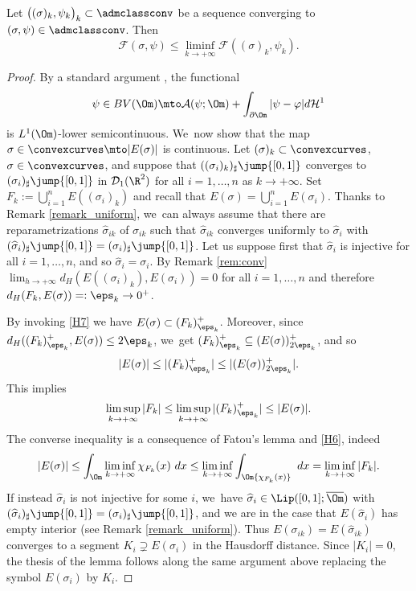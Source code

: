 \begin{lemma}
\label{lem:lower_semicontinuity_of_F}
Let $\big((\sigma)_k,\psi_k\big)_k\subset\admclassconv$ be a sequence converging
to $(\sigma,\psi)\in \admclassconv$. Then
\begin{equation*}
\mathcal{F}(\sigma,\psi)\le\liminf_{k\to+\infty}\mathcal{F}((\sigma)_k,\psi_k).
\end{equation*}
\end{lemma}
\begin{proof}
By a standard argument \cite{Giusti:84}, the functional
\begin{equation*}
\psi\in BV(\Om)\mto \mathcal{A}(\psi;\Om)+\int_{\partial\Om}|\psi-\varphi|d\mathcal H^1
\end{equation*}
is $L^1(\Om)$-lower semicontinuous. We~now show that the map $\sigma \in
\convexcurves
\mto|E(\sigma)|$
is continuous.
Let $(\sigma)_k \subset \convexcurves$,
$\sigma \in\convexcurves$, and suppose that
$((\sigma_{i})_k)_\sharp\jump{[0,1]}$ converges to $(\sigma_i)_\sharp\jump{[0,1]}$ in $\mathcal D_1(\R^2)$
for all $i=1,\dots,n$ as $k \to +\infty$.
Set $F_k:=\bigcup_{i=1}^n E((\sigma_{i})_k)$ and recall that
$E(\sigma)=\bigcup_{i=1}^n E(\sigma_{i})$. { Thanks to Remark \ref{remark_uniform}, we~can always assume that there are reparametrizations $\widehat\sigma_{ik}$ of $\sigma_{ik}$ such that $\widehat\sigma_{ik}$ converges uniformly to $\widehat \sigma_i$ with $(\widehat \sigma_i)_\sharp\jump{[0,1]}=(\sigma_i)_\sharp\jump{[0,1]}$. Let us suppose first that $\widehat \sigma_i$ is injective for all $i=1,\dots,n$, and so $\widehat\sigma_i=\sigma_i$.}
By Remark \ref{rem:conv}
$\lim_{h \to +\infty} d_H(E((\sigma_{i})_k),E(\sigma_i)) = 0$
for all $i=1,\dots,n$ and therefore $d_H(F_k,E(\sigma)) =: \eps_k\to 0^+$.

By invoking \ref{H7} we have $E(\sigma)\subset (F_k)^+_{\eps_k}$.
Moreover, since $d_H((F_k)_{\eps_k}^+,E(\sigma))\leq 2\eps_k$, we~get $(F_k)^+_{\eps_k}\subseteq (E(\sigma))_{2\eps_k}^+$, and so
\begin{equation*}
\vert E(\sigma)\vert\le \vert (F_k)^+_{\eps_k}\vert
\le \vert (E(\sigma))_{2\eps_k}^+\vert.
\end{equation*}
This implies
\[
\limsup_{k\to+\infty} |F_k|\leq \limsup_{k\to+\infty} |(F_k)^+_{\eps_k}|\le\mathcal |E(\sigma)|.
\]
The converse inequality is a consequence of Fatou's lemma and \ref{H6}, indeed
\[
|E(\sigma)|\leq \int_\Om\liminf_{k\to+\infty}{\chi_{F_k}(x)}~dx\leq\liminf_{k\to+\infty}\int_\Om{\chi_{F_k}(x)}~dx =\liminf_{k\to+\infty}|F_k|.
\]
If instead $\widehat\sigma_i$ is not injective for some $i$, we~have $\widehat \sigma_i\in\Lip([0,1];\overline\Om)$ with $(\widehat \sigma_i)_\sharp\jump{[0,1]}=(\sigma_i)_\sharp\jump{[0,1]}$, and we are in the case that $E(\widehat\sigma_i)$ has empty interior (see Remark \ref{remark_uniform}). Thus $ E(\sigma_{ik})=E(\widehat\sigma_{ik})$ converges to a segment $K_i\supsetneq E(\sigma_i)$ in the Hausdorff distance.
Since $|K_i|=0$, the thesis of the lemma follows along the same argument above replacing the symbol $E(\sigma_i)$ by $K_i$.
\end{proof}

